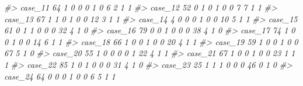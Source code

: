 \documentclass[]{book}
\newenvironment{Shaded}{\begin{snugshade}}{\end{snugshade}}
\newcommand{\CommentTok}[1]{\textcolor[rgb]{0.56,0.35,0.01}{\textit{#1}}}
\begin{document}
\begin{Shaded}
\begin{Highlighting}[]
\CommentTok{#> case_11   64        1        0                0                 0                 1              0                     6                      2           1             1}
\CommentTok{#> case_12   52        0        1                0                 1                 0              0                     7                      7           1             1}
\CommentTok{#> case_13   67        1        1                0                 1                 0              0                    12                      3           1             1}
\CommentTok{#> case_14    4        0        0                0                 1                 0              0                    10                      5           1             1}
\CommentTok{#> case_15   61        0        1                1                 0                 0              0                    32                      4           1             0}
\CommentTok{#> case_16   79        0        0                1                 0                 0              0                    38                      4           1             0}
\CommentTok{#> case_17   74        1        0                0                 1                 0              0                    14                      6           1             1}
\CommentTok{#> case_18   66        1        0                0                 1                 0              0                    20                      4           1             1}
\CommentTok{#> case_19   59        1        0                0                 1                 0              0                    67                      5           1             0}
\CommentTok{#> case_20   55        1        0                0                 0                 0              1                    22                      4           1             1}
\CommentTok{#> case_21   67        1        0                0                 1                 0              0                    23                      1           1             1}
\CommentTok{#> case_22   85        1        0                1                 0                 0              0                    31                      4           1             0}
\CommentTok{#> case_23   25        1        1                1                 0                 0              0                    46                      0           1             0}
\CommentTok{#> case_24   64        0        0                0                 1                 0              0                     6                      5           1             1}

\end{Highlighting}
\end{Shaded}
\end{document}
